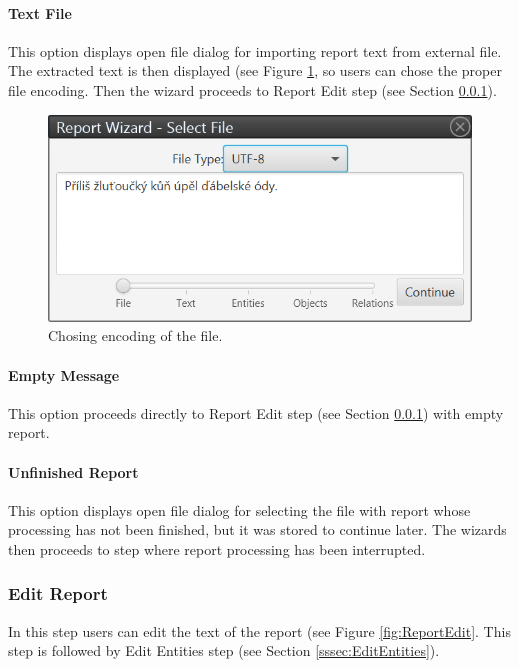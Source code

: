 \paragraph{Text File} This option displays open file dialog for importing
report text from external file. The extracted text is then displayed (see
Figure \ref{fig:TextFile}, so users can chose the proper file encoding. Then
the wizard proceeds to Report Edit step (see Section \ref{sssec:ReportEdit}).

\begin{figure}[!htb]
        \centering
        \includegraphics[width=\textwidth]{Images/textfile}
        \caption{Chosing encoding of the file.}
        \label{fig:TextFile}
\end{figure}

\paragraph{Empty Message} This option proceeds directly to Report Edit step
(see Section \ref{sssec:ReportEdit}) with empty report.

\paragraph{Unfinished Report} This option displays open file dialog for
selecting the file with report whose processing has not been finished, but it
was stored to continue later. The wizards then proceeds to step where report
processing has been interrupted.

\subsubsection{Edit Report}
\label{sssec:ReportEdit}

In this step users can edit the text of the report (see Figure
\ref{fig:ReportEdit}. This step is followed by Edit Entities step (see Section
\ref{sssec:EditEntities}).

